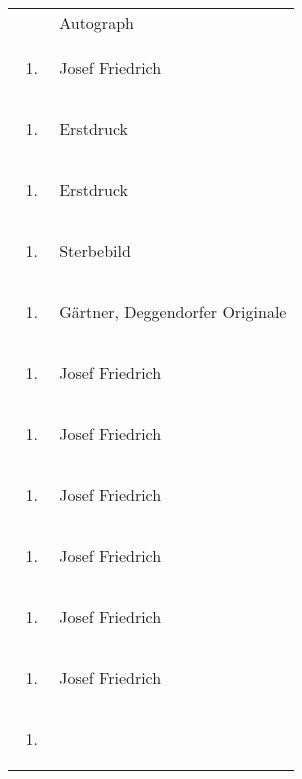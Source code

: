 \documentclass[a4paper]{article}
\begin{document}
\begin{flushleft}
\begin{supertabular}{m{1.2409999cm}m{14.604cm}}
 &
Autograph\\
\begin{enumerate}
\item 
\end{enumerate}
 &
Josef Friedrich\\
\begin{enumerate}
\item 
\end{enumerate}
 &
Erstdruck\\
\begin{enumerate}
\item 
\end{enumerate}
 &
Erstdruck\\
\begin{enumerate}
\item 
\end{enumerate}
 &
Sterbebild\\
\begin{enumerate}
\item 
\end{enumerate}
 &
Gärtner, Deggendorfer Originale\\
\begin{enumerate}
\item 
\end{enumerate}
 &
Josef Friedrich\\
\begin{enumerate}
\item 
\end{enumerate}
 &
Josef Friedrich\\
\begin{enumerate}
\item 
\end{enumerate}
 &
Josef Friedrich\\
\begin{enumerate}
\item 
\end{enumerate}
 &
Josef Friedrich\\
\begin{enumerate}
\item 
\end{enumerate}
 &
Josef Friedrich\\
\begin{enumerate}
\item 
\end{enumerate}
 &
Josef Friedrich\\
\begin{enumerate}
\item 

\end{enumerate}
\end{supertabular}
\end{flushleft}
\end{document}
